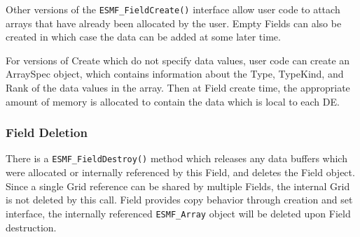 Other versions of the {\tt ESMF\_FieldCreate()} interface
allow user code to attach arrays that have already been
allocated by the user.  Empty Fields can also be created in
which case the data can be added at some later time.

For versions of Create which do not specify data values,
user code can create an ArraySpec object, which
contains information about the Type, TypeKind, and Rank of the
data values in the array.  Then at Field create time, the
appropriate amount of memory is allocated to contain the
data which is local to each DE.

\subsubsection{Field Deletion}

There is a {\tt ESMF\_FieldDestroy()} method which releases
any data buffers which were allocated or internally referenced 
by this Field,
and deletes the Field object.  Since a single Grid reference 
can be shared by multiple Fields, the internal Grid is not deleted by 
this call. Field provides copy behavior through creation and
set interface, the internally referenced {\tt ESMF\_Array} object
will be deleted upon Field destruction.
